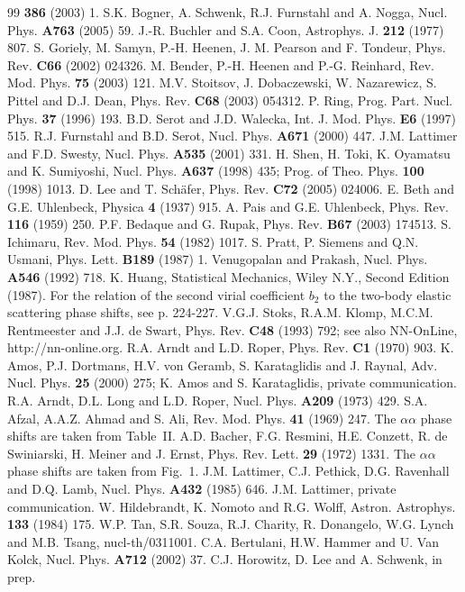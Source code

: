 \documentclass[aps,prc,twocolumn,showpacs,showkeys,amsmath,amssymb]{revtex4}
\begin{document}
\begin{thebibliography}{99}
\textbf{386} (2003) 1. 
 S.K. Bogner, A. Schwenk, R.J. Furnstahl and
A. Nogga, Nucl. Phys. \textbf{A763} (2005) 59.
 J.-R. Buchler and S.A. Coon, Astrophys. J. \textbf{212} (1977)
807.
 S. Goriely, M. Samyn, P.-H. Heenen, J. M. Pearson
and F. Tondeur, Phys. Rev. \textbf{C66} (2002) 024326.
 M. Bender, P.-H. Heenen and P.-G. Reinhard, Rev. 
Mod. Phys. \textbf{75} (2003) 121.
 M.V. Stoitsov, J. Dobaczewski, W. Nazarewicz, 
S. Pittel and D.J. Dean, Phys. Rev. \textbf{C68} (2003) 054312.
 P. Ring, Prog. Part. Nucl. Phys. \textbf{37} (1996) 193.
 B.D. Serot and J.D. Walecka, Int. J. Mod. Phys. 
\textbf{E6} (1997) 515.
 R.J. Furnstahl and B.D. Serot, Nucl. Phys. \textbf{A671} 
(2000) 447.
 J.M. Lattimer and F.D. Swesty, Nucl. Phys. \textbf{A535}
(2001) 331.
 H. Shen, H. Toki, K. Oyamatsu and K. Sumiyoshi, Nucl. Phys. 
\textbf{A637} (1998) 435; Prog. of Theo. Phys. \textbf{100} (1998) 1013.
 D. Lee and T. Sch\"afer, Phys. Rev. \textbf{C72} (2005) 
024006.
 E. Beth and G.E. Uhlenbeck, Physica \textbf{4} (1937) 915.
 A. Pais and G.E. Uhlenbeck, Phys. Rev. 
\textbf{116} (1959) 250.
 P.F. Bedaque and G. Rupak, Phys. Rev. \textbf{B67}
(2003) 174513.
 S. Ichimaru, Rev. Mod. Phys. \textbf{54} (1982) 1017.
 S. Pratt, P. Siemens and Q.N. Usmani, Phys. Lett.
\textbf{B189} (1987) 1.
 Venugopalan and Prakash, Nucl. Phys. \textbf{A546} 
(1992) 718.
 K. Huang, Statistical Mechanics, Wiley N.Y., Second
Edition (1987). For the relation of the second virial coefficient $b_2$
to the two-body elastic scattering phase shifts, see p. 224-227.
 V.G.J. Stoks, R.A.M. Klomp, M.C.M. Rentmeester and 
J.J. de Swart, Phys. Rev. \textbf{C48} (1993) 792; see also NN-OnLine,
http://nn-online.org.
 R.A. Arndt and L.D. Roper, Phys. Rev. \textbf{C1}
(1970) 903.
 K. Amos, P.J. Dortmans, H.V. von Geramb, 
S. Karataglidis and J. Raynal, Adv. Nucl. Phys. \textbf{25} (2000) 275;
K. Amos and S. Karataglidis, private communication.
 R.A. Arndt, D.L. Long and L.D. Roper, Nucl. Phys. 
\textbf{A209} (1973) 429.
 S.A. Afzal, A.A.Z. Ahmad and S. Ali, Rev. Mod. Phys.
\textbf{41} (1969) 247. The $\alpha\alpha$ phase shifts are taken from 
Table~II.
 A.D. Bacher, F.G. Resmini, H.E. Conzett, R. de Swiniarski,
H. Meiner and J. Ernst, Phys. Rev. Lett. \textbf{29} (1972) 1331. The 
$\alpha\alpha$ phase shifts are taken from Fig.~1.
 J.M. Lattimer, C.J. Pethick, D.G. Ravenhall and D.Q. Lamb,
Nucl. Phys. \textbf{A432} (1985) 646.
 J.M. Lattimer, private communication.
 W. Hildebrandt, K. Nomoto and R.G. Wolff, Astron.
Astrophys. \textbf{133} (1984) 175.
 W.P. Tan, S.R. Souza, R.J. Charity, R. Donangelo, 
W.G. Lynch and M.B. Tsang, nucl-th/0311001.
 C.A. Bertulani, H.W. Hammer and U. Van Kolck, Nucl.
Phys. \textbf{A712} (2002) 37.
 C.J. Horowitz, D. Lee and A. Schwenk, in prep.
\end{thebibliography}
\end{document}

